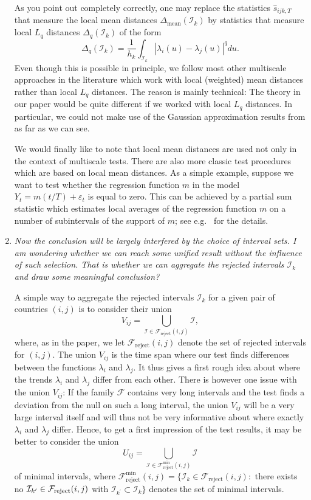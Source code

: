 \documentclass[a4paper,12pt]{article}
\begin{document}
\begin{enumerate}[label=(\arabic*),leftmargin=0.7cm]
As you point out completely correctly, one may replace the statistics $\hat{s}_{ijk,T}$ that measure the local mean distances $\Delta_{\text{mean}}(\mathcal{I}_k)$ by statistics that measure local $L_q$ distances $\Delta_q(\mathcal{I}_k)$ of the form 
\[ \Delta_q(\mathcal{I}_k) = \frac{1}{h_k} \int_{\mathcal{I}_k} |\lambda_i(u) - \lambda_j(u)|^q du. \]
Even though this is possible in principle, we follow most other multiscale approaches in the literature which work with local (weighted) mean distances rather than local $L_q$ distances. The reason is mainly technical: The theory in our paper would be quite different if we worked with local $L_q$ distances. In particular, we could not make use of the Gaussian approximation results from \cite{Chernozhukov2017} as far as we can see. 

We would finally like to note that local mean distances are used not only in the context of multiscale tests. There are also more classic test procedures which are based on local mean distances. As a simple example, suppose we want to test whether the regression function $m$ in the model $Y_t = m(t/T) + \varepsilon_t$ is equal to zero. This can be achieved by a partial sum statistic which estimates local averages of the regression function $m$ on a number of subintervals of the support of $m$; see e.g.\ \cite{Stute1997} for the details. 


\item \textit{Now the conclusion will be largely interfered by the choice of interval sets. I am wondering whether we can reach some unified result without the influence of such selection. That is whether we can aggregate the rejected intervals $\mathcal{I}_k$ and draw some meaningful conclusion?}

A simple way to aggregate the rejected intervals $\mathcal{I}_k$ for a given pair of countries $(i,j)$ is to consider their union
\[ V_{ij} = \bigcup_{\mathcal{I} \in \mathcal{F}_{\text{reject}}(i,j)} \mathcal{I}, \]
where, as in the paper, we let $\mathcal{F}_{\text{reject}}(i,j)$ denote the set of rejected intervals for $(i,j)$. The union $V_{ij}$ is the time span where our test finds differences between the functions $\lambda_i$ and $\lambda_j$. It thus gives a first rough idea about where the trends $\lambda_i$ and $\lambda_j$ differ from each other. There is however one issue with the union $V_{ij}$: If the family $\mathcal{F}$ contains very long intervals and the test finds a deviation from the null on such a long interval, the union $V_{ij}$ will be a very large interval itself and will thus not be very informative about where exactly $\lambda_i$ and $\lambda_j$ differ. Hence, to get a first impression of the test results, it may be better to consider the union 
\[ U_{ij} = \bigcup_{\mathcal{I} \in \mathcal{F}_{\text{reject}}^{\min}(i,j)} \mathcal{I} \]
of minimal intervals, where $\mathcal{F}_{\text{reject}}^{\text{min}}(i,j) = \{ \mathcal{I}_k \in \mathcal{F}_{\text{reject}}(i,j):$  there exists no $\mathcal{I}_{k^\prime} \in \mathcal{F}_{\text{reject}}(i,j)$ with $\mathcal{I}_{k^\prime} \subset \mathcal{I}_k \}$ denotes the set of minimal intervals. 


\end{enumerate}
\end{document}
